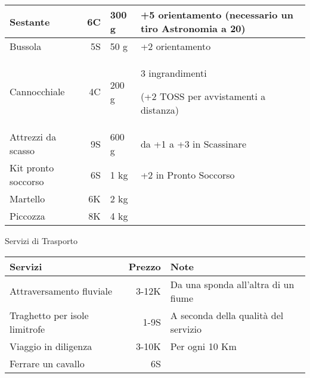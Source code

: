 \begin{table*}
\begin{center}
\begin{tabular}{|l|r|p{1cm}|p{8cm}|}
      Sestante& 6C& 300 g& +5 orientamento (necessario un tiro Astronomia a 20)\\ \hline 
      Bussola& 5S& 50 g& +2 orientamento \\ \hline
      Cannocchiale&4C& 200 g& 3 ingrandimenti\par (+2 TOSS per avvistamenti a distanza) \\ \hline
      Attrezzi da scasso& 9S& 600 g& da +1 a +3 in Scassinare \\ \hline
      Kit pronto soccorso& 6S& 1 kg& +2 in Pronto Soccorso \\ \hline
      Martello& 6K& 2 kg&\\ \hline
      Piccozza& 8K& 4 kg&\\ \hline
     \end{tabular}
    \caption{Equipaggiamento}
    \label{tabequipaggiamento}
  \end{center}         
\end{table*} 

\iffullversion
\begin{table*}
  \begin{center}
    {\Large\sc Servizi di Trasporto}\medskip
    
    \small\begin{tabular}{|l|r|p{8cm}|}
      \hline
      Servizi& Prezzo & Note  \\ \hline
      \hline
      Attraversamento fluviale&3-12K& Da una sponda all'altra di un fiume \\ \hline
      Traghetto per isole limitrofe& 1-9S& A seconda della qualit\`a del servizio \\ \hline 
      Viaggio in diligenza& 3-10K& Per ogni 10 Km \\ \hline
      Ferrare un cavallo& 6S& \\ \hline
     \end{tabular}
    \caption{Trasporto}
  \end{center}         
\end{table*} 
\fi

